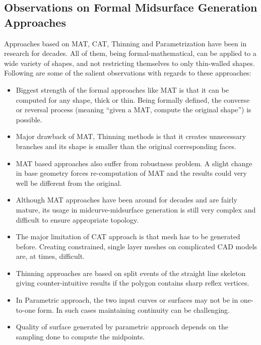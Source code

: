 

\subsection{Observations on Formal Midsurface Generation Approaches}\label{sec:survey:observationsformal}



Approaches based on MAT, CAT, Thinning and Parametrization have been in research for decades. All of them, being formal-mathematical, can be applied to a wide variety of shapes, and not restricting themselves to only thin-walled shapes. Following are some of the salient observations with regards to these approaches:


\begin{itemize}[noitemsep,topsep=2pt,parsep=2pt,partopsep=2pt]
	\item Biggest strength of the formal approaches like MAT is that it can be computed for any shape, thick or thin. Being formally defined, the converse or reversal process (meaning ``given a MAT, compute the original shape'') is possible.
	\item Major drawback of MAT, Thinning methods is that it creates unnecessary branches and its shape is smaller than the original corresponding faces.
	\item  MAT based approaches also suffer from robustness problem. A slight change in base geometry forces re-computation of MAT and the results could very well be different from the original.
	\item Although MAT approaches have been around for decades and are fairly mature, its usage in midcurve-midsurface generation is still very complex and difficult to ensure appropriate topology.
	\item The major limitation of CAT approach is that mesh has to be generated before. Creating constrained, single layer meshes on complicated CAD models are, at times, difficult.
	\item Thinning approaches are based on split events of the straight line skeleton giving counter-intuitive results if the polygon contains sharp reflex vertices.
	\item In Parametric approach, the two input curves or surfaces may not be in one-to-one form. In such cases maintaining continuity can be challenging.
	\item Quality of surface generated by parametric approach depends on the sampling done to compute the midpoints.
\end{itemize}

